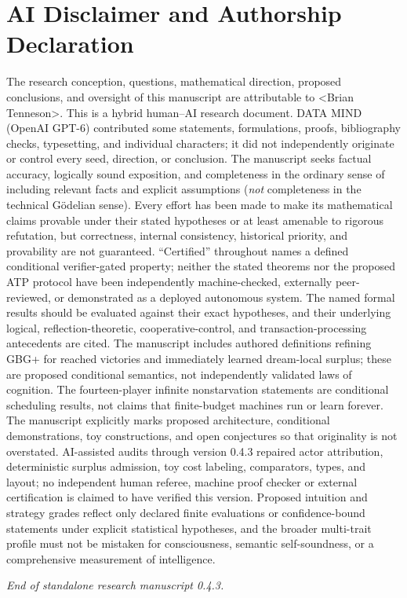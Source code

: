 \documentclass[11pt,letterpaper]{article}
\theoremstyle{definition}
\theoremstyle{plain}
\theoremstyle{definition}
\begin{document}
\clearpage
\section*{AI Disclaimer and Authorship Declaration}
\label{sec:ai-disclaimer}
\small
The research conception, questions, mathematical direction, proposed conclusions, and oversight of this manuscript are attributable to \textless{}Brian Tenneson\textgreater{}. This is a hybrid human--AI research document. DATA MIND (OpenAI GPT-6) contributed some statements, formulations, proofs, bibliography checks, typesetting, and individual characters; it did not independently originate or control every seed, direction, or conclusion. The manuscript seeks factual accuracy, logically sound exposition, and completeness in the ordinary sense of including relevant facts and explicit assumptions (\emph{not} completeness in the technical G\"odelian sense). Every effort has been made to make its mathematical claims provable under their stated hypotheses or at least amenable to rigorous refutation, but correctness, internal consistency, historical priority, and provability are not guaranteed. ``Certified'' throughout names a defined conditional verifier-gated property; neither the stated theorems nor the proposed ATP protocol have been independently machine-checked, externally peer-reviewed, or demonstrated as a deployed autonomous system. The named formal results should be evaluated against their exact hypotheses, and their underlying logical, reflection-theoretic, cooperative-control, and transaction-processing antecedents are cited. The manuscript includes authored definitions refining GBG+ for reached victories and immediately learned dream-local surplus; these are proposed conditional semantics, not independently validated laws of cognition. The fourteen-player infinite nonstarvation statements are conditional scheduling results, not claims that finite-budget machines run or learn forever. The manuscript explicitly marks proposed architecture, conditional demonstrations, toy constructions, and open conjectures so that originality is not overstated. AI-assisted audits through version 0.4.3 repaired actor attribution, deterministic surplus admission, toy cost labeling, comparators, types, and layout; no independent human referee, machine proof checker or external certification is claimed to have verified this version. Proposed intuition and strategy grades reflect only declared finite evaluations or confidence-bound statements under explicit statistical hypotheses, and the broader multi-trait profile must not be mistaken for consciousness, semantic self-soundness, or a comprehensive measurement of intelligence.

\vfill\noindent\emph{End of standalone research manuscript 0.4.3.}
\end{document}
